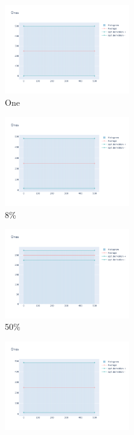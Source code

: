 \documentclass[12pt, fleqn]{report}                             %
\theoremstyle{break}                                            %
\begin{document}
      \begin{figure}[ht!]
        \centering
        \begin{subfigure}[b]{0.4\linewidth}
          \includegraphics[width=0.6\textwidth]{Images/19/dia-a.png}
          \caption{One}
        \end{subfigure}
        \begin{subfigure}[b]{0.4\linewidth}
          \includegraphics[width=0.6\textwidth]{Images/19/dia-b.png}
          \caption{8\%}
        \end{subfigure}
        \begin{subfigure}[b]{0.4\linewidth}
          \includegraphics[width=0.6\textwidth]{Images/19/dia-c.png}
          \caption{50\%}
        \end{subfigure}
        \begin{subfigure}[b]{0.4\linewidth}
          \includegraphics[width=0.6\textwidth]{Images/19/dia-d.png}

\end{subfigure}
\end{figure}
\end{document}
